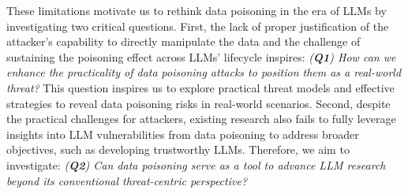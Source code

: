These limitations motivate us to rethink data poisoning in the era of LLMs by investigating two critical questions. First, the lack of proper justification of the attacker's capability to directly manipulate the data and the challenge of sustaining the poisoning effect across LLMs’ lifecycle inspires: 
\textit{(\textbf{Q1}) How can we enhance the practicality of data poisoning attacks to position them as a real-world threat?} This question inspires us to explore practical threat models and effective strategies to reveal data poisoning risks in real-world scenarios.
Second, despite the practical challenges for attackers, existing research also fails to fully leverage insights into LLM vulnerabilities from data poisoning to address broader objectives, such as developing trustworthy LLMs.
Therefore, we aim to investigate:
\textit{(\textbf{Q2}) Can data poisoning serve as a tool to advance LLM research beyond its conventional threat-centric perspective?} 
